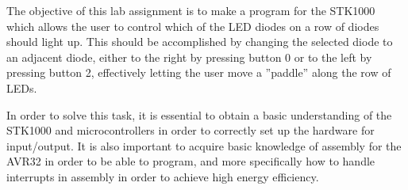 The objective of this lab assignment is to make a program for the STK1000 which allows the user to control which of the LED diodes on a row of diodes should light up.
This should be accomplished by changing the selected diode to an adjacent diode, either to the right by pressing button 0 or to the left by pressing button 2, effectively letting the user move a ''paddle'' along the row of LEDs.

In order to solve this task, it is essential to obtain a basic understanding of the STK1000 and microcontrollers in order to correctly set up the hardware for input/output.
It is also important to acquire basic knowledge of assembly for the AVR32 in order to be able to program, and more specifically how to handle interrupts in assembly in order to achieve high energy efficiency.
